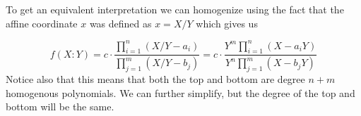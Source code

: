 \documentclass[12pt]{amsart}
\begin{document}
\begin{itemize}
To get an equivalent interpretation we can homogenize using the fact that the affine coordinate $x$
was defined as $x=X/Y$ which gives us

\[f(X:Y)=c\cdot\frac{\displaystyle{\prod^n_{i=1}(X/Y-a_i)}}{\displaystyle{\prod_{j=1}^m(X/Y-b_j)}}=c\cdot\frac{\displaystyle{Y^m\prod^n_{i=1}(X-a_iY)}}{\displaystyle{Y^n\prod_{j=1}^m(X-b_jY)}}\]
Notice also that this means that both the top and bottom are degree $n+m$ homogenous polynomials. 
We can further simplify, but the degree of the top and bottom will be the same.

\end{itemize}
\end{document}
